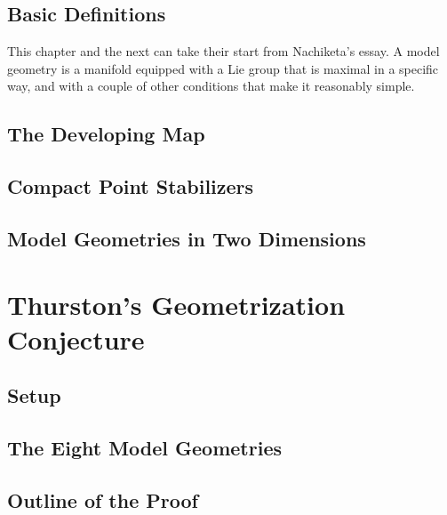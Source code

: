 \documentclass[oneside,english]{amsbook}
\numberwithin{section}{chapter}
\theoremstyle{plain}
\theoremstyle{definition}
\begin{document}
		\section{Basic Definitions}
			This chapter and the next can take their start from Nachiketa's essay. A model geometry is a manifold equipped with a Lie group that is maximal in a specific way, and with a couple of other conditions that make it reasonably simple.
			
		\section{The Developing Map}
	
		\section{Compact Point Stabilizers}

		\section{Model Geometries in Two Dimensions}

	\chapter{Thurston's Geometrization Conjecture}

		\section{Setup}

		\section{The Eight Model Geometries}

		\section{Outline of the Proof}
\end{document}
